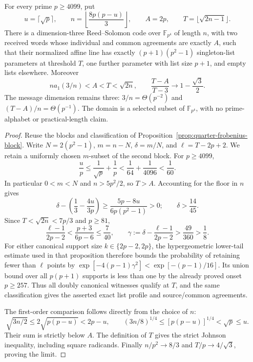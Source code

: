 \begin{corollary}\label{cor:near-third-frobenius-block}
For every prime $p\ge4099$, put
\[
 u=\lceil\sqrt p\rceil,\qquad
 n=\left\lfloor\frac{8p(p-u)}3\right\rfloor,\qquad
 A=2p,\qquad T=\lfloor\sqrt{2n-1}\rfloor.
\]
There is a dimension-three Reed--Solomon code over $\mathbb F_{p^4}$
of length $n$, with two received words whose individual and common
agreements are exactly $A$, such that their normalized affine line has
exactly $(p+1)(p^2-1)$ singleton-list parameters at threshold $T$, one
further parameter with list size $p+1$, and empty lists elsewhere.
Moreover
\[
 n a_1(3/n)<A<T<\sqrt{2n},\qquad
 \frac{T-A}{T-3}\longrightarrow1-\frac{\sqrt3}{2}.
\]
The message dimension remains three: $3/n=\Theta(p^{-2})$ and
$(T-A)/n=\Theta(p^{-1})$. The domain is a selected subset of
$\mathbb F_{p^4}$, with no prime-alphabet or practical-length claim.
\end{corollary}

\begin{proof}
Reuse the blocks and classification of
Proposition~\ref{prop:quarter-frobenius-block}.
Write $N=2(p^2-1)$, $m=n-N$, $\delta=m/N$, and
$\ell=T-2p+2$. We retain a uniformly chosen $m$-subset of the second
block. For $p\ge4099$,
\[
 \frac up\le\frac1{\sqrt p}+\frac1p
 <\frac1{64}+\frac1{4096}<\frac1{60}.
\]
In particular $0<m<N$ and $n>5p^2/2$, so $T>A$.
Accounting for the floor in $n$ gives
\[
 \delta-\left(\frac13-\frac{4u}{3p}\right)
 \ge\frac{5p-8u}{6p(p^2-1)}>0;
 \qquad \delta>\frac{14}{45}.
\]
Since $T<\sqrt{2n}<7p/3$ and $p\ge81$,
\[
 \frac{\ell-1}{2p-2}
 <\frac{p+3}{6p-6}\le\frac7{40},
 \qquad
 \gamma:=\delta-\frac{\ell-1}{2p-2}
 >\frac{49}{360}>\frac18.
\]
For either canonical support size $k\in\{2p-2,2p\}$, the
hypergeometric lower-tail estimate used in that proposition therefore
bounds the probability of retaining fewer than $\ell$ points by
$\exp[-4(p-1)\gamma^2]<\exp[-(p-1)/16]$.
Its union bound over all $p(p+1)$ supports is less than one by the
already proved onset $p\ge257$. Thus all doubly canonical witnesses
qualify at $T$, and the same classification gives the asserted exact
list profile and source/common agreements.

The first-order comparison follows directly from the choice of $n$:
\[
 \sqrt{3n/2}\le2\sqrt{p(p-u)}<2p-u,\qquad
 (3n/8)^{1/4}\le[p(p-u)]^{1/4}<\sqrt p\le u.
\]
Their sum is strictly below $A$. The definition of $T$ gives the
strict Johnson inequality, including square radicands.
Finally $n/p^2\to8/3$ and $T/p\to4/\sqrt3$, proving the limit.
\end{proof}

